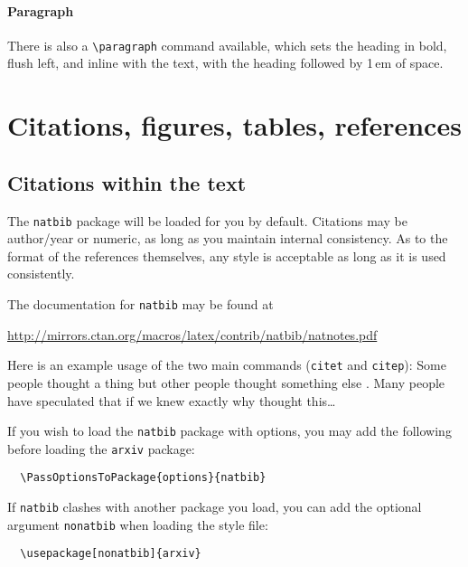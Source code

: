 \documentclass{article}
\begin{document}
\paragraph{Paragraph}

There is also a \verb+\paragraph+ command available, which sets the heading in
bold, flush left, and inline with the text, with the heading followed by 1\,em
of space.

\section{Citations, figures, tables, references}
\label{sec:others}

\subsection{Citations within the text}

The \verb+natbib+ package will be loaded for you by default.  Citations may be
author/year or numeric, as long as you maintain internal consistency.  As to the
format of the references themselves, any style is acceptable as long as it is
used consistently.

The documentation for \verb+natbib+ may be found at
\begin{center}
  \url{http://mirrors.ctan.org/macros/latex/contrib/natbib/natnotes.pdf}
\end{center}

Here is an example usage of the two main commands (\verb+citet+ and \verb+citep+): Some people thought a thing \citep{kour2014real, keshet2016prediction} but other people thought something else \citep{kour2014fast}. Many people have speculated that if we knew exactly why \citet{kour2014fast} thought this\dots

If you wish to load the \verb+natbib+ package with options, you may add the
following before loading the \verb+arxiv+ package:
\begin{verbatim}
  \PassOptionsToPackage{options}{natbib}
\end{verbatim}

If \verb+natbib+ clashes with another package you load, you can add the optional
argument \verb+nonatbib+ when loading the style file:
\begin{verbatim}
  \usepackage[nonatbib]{arxiv}
\end{verbatim}
\end{document}
